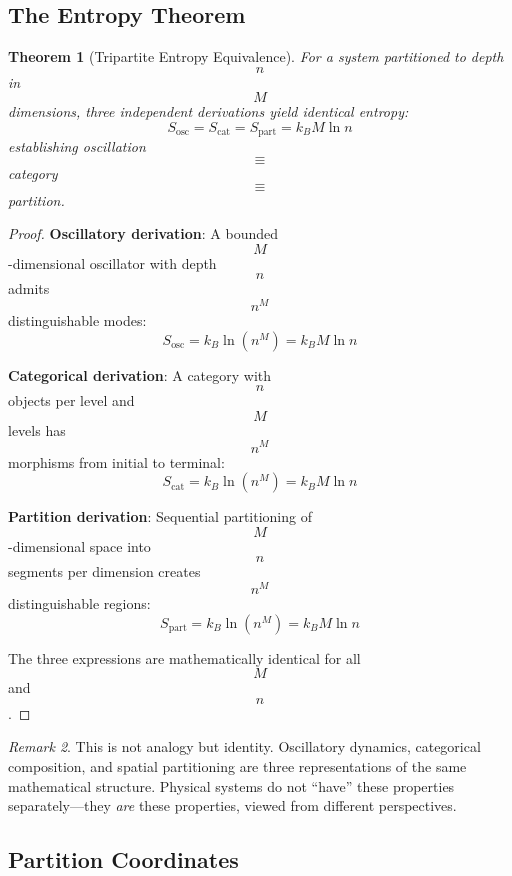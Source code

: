 \documentclass[11pt,twocolumn,a4paper]{article}
\newtheorem{theorem}{Theorem}[section]
\theoremstyle{definition}
\theoremstyle{remark}
\newtheorem{remark}[theorem]{Remark}
\begin{document}
\subsection{The Entropy Theorem}

\begin{theorem}[Tripartite Entropy Equivalence]
\label{thm:entropy}
For a system partitioned to depth $$n$$ in $$M$$ dimensions, three independent derivations yield identical entropy:
\begin{equation}
S_{\text{osc}} = S_{\text{cat}} = S_{\text{part}} = k_B M \ln n
\end{equation}
establishing oscillation $$\equiv$$ category $$\equiv$$ partition.
\end{theorem}

\begin{proof}
\textbf{Oscillatory derivation}: A bounded $$M$$-dimensional oscillator with depth $$n$$ admits $$n^M$$ distinguishable modes:
\begin{equation}
S_{\text{osc}} = k_B \ln(n^M) = k_B M \ln n
\end{equation}

\textbf{Categorical derivation}: A category with $$n$$ objects per level and $$M$$ levels has $$n^M$$ morphisms from initial to terminal:
\begin{equation}
S_{\text{cat}} = k_B \ln(n^M) = k_B M \ln n
\end{equation}

\textbf{Partition derivation}: Sequential partitioning of $$M$$-dimensional space into $$n$$ segments per dimension creates $$n^M$$ distinguishable regions:
\begin{equation}
S_{\text{part}} = k_B \ln(n^M) = k_B M \ln n
\end{equation}

The three expressions are mathematically identical for all $$M$$ and $$n$$.
\end{proof}

\begin{remark}
This is not analogy but identity. Oscillatory dynamics, categorical composition, and spatial partitioning are three representations of the same mathematical structure. Physical systems do not ``have'' these properties separately---they \emph{are} these properties, viewed from different perspectives.
\end{remark}

\subsection{Partition Coordinates}
\end{document}
